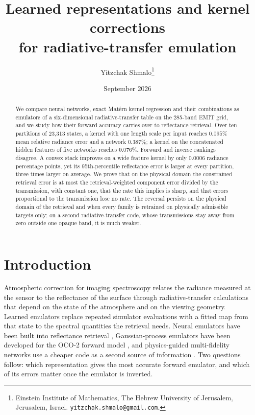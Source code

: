 \documentclass[11pt]{article}
\title{Learned representations and kernel corrections\\ for radiative-transfer emulation}
\author{Yitzchak Shmalo\thanks{Einstein Institute of Mathematics, The Hebrew University of Jerusalem, Jerusalem, Israel. \texttt{yitzchak.shmalo@gmail.com}.}}
\date{September 2026}
\newcommand{\1}{\mathbf{1}}
\begin{document}
\maketitle

\begin{abstract}
We compare neural networks, exact Mat\'ern kernel regression and their combinations as
emulators of a six-dimensional radiative-transfer table on the 285-band EMIT grid, and we
study how their forward accuracy carries over to reflectance retrieval. Over ten partitions
of 23{,}313 states, a kernel with one length scale per input reaches $0.095\%$ mean relative
radiance error and a network $0.387\%$; a kernel on the concatenated hidden features of five
networks reaches $0.076\%$. Forward and inverse rankings disagree. A convex stack improves on
a wide feature kernel by only $0.0006$ radiance percentage points, yet its 95th-percentile
reflectance error is larger at every partition, three times larger on average. We prove that on the physical domain
the constrained retrieval error is at most the retrieval-weighted component error divided by
the transmission, with constant one, that the rate this implies is sharp, and that errors
proportional to the transmission lose no rate. The reversal persists on the physical domain of the retrieval and when every family is retrained on physically admissible targets only; on a second radiative-transfer code, whose transmissions stay away from zero outside one opaque band, it is much weaker.
\end{abstract}

\section{Introduction}

Atmospheric correction for imaging spectroscopy relates the radiance measured at the sensor
to the reflectance of the surface through radiative-transfer calculations that depend on the
state of the atmosphere and on the viewing geometry. Learned emulators replace repeated
simulator evaluations with a fitted map from that state to the spectral quantities the
retrieval needs. Neural emulators have been built into reflectance retrieval
\cite{srtmnet}, Gaussian-process emulators have been developed for the OCO-2 forward
model \cite{lamminpaa}, and physics-guided multi-fidelity networks use a cheaper code as a
second source of information \cite{pkan}. Two questions follow: which representation gives
the most accurate forward emulator, and which of its errors matter once the emulator is
inverted.
\end{document}
